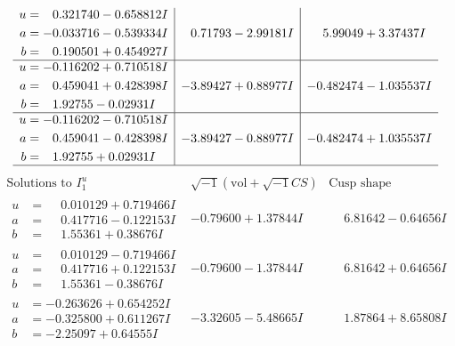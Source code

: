 \documentclass[1p]{elsarticle_modified}
\theoremstyle{definition}
\newcommand{\I}{\sqrt{-1}}
\begin{document}
$$\begin{array}{c|c|c}
\begin{aligned}
u &= \phantom{-}0.321740 - 0.658812 I \\
a &= -0.033716 - 0.539334 I \\
b &= \phantom{-}0.190501 + 0.454927 I\end{aligned}
 & \phantom{-}0.71793 - 2.99181 I & \phantom{-}5.99049 + 3.37437 I \\ \hline\begin{aligned}
u &= -0.116202 + 0.710518 I \\
a &= \phantom{-}0.459041 + 0.428398 I \\
b &= \phantom{-}1.92755 - 0.02931 I\end{aligned}
 & -3.89427 + 0.88977 I & -0.482474 - 1.035537 I \\ \hline\begin{aligned}
u &= -0.116202 - 0.710518 I \\
a &= \phantom{-}0.459041 - 0.428398 I \\
b &= \phantom{-}1.92755 + 0.02931 I\end{aligned}
 & -3.89427 - 0.88977 I & -0.482474 + 1.035537 I\\
 \hline 
 \end{array}$$\newpage$$\begin{array}{c|c|c}  
\text{Solutions to }I^u_{1}& \I (\text{vol} + \sqrt{-1}CS) & \text{Cusp shape}\\
 \hline 
\begin{aligned}
u &= \phantom{-}0.010129 + 0.719466 I \\
a &= \phantom{-}0.417716 - 0.122153 I \\
b &= \phantom{-}1.55361 + 0.38676 I\end{aligned}
 & -0.79600 + 1.37844 I & \phantom{-}6.81642 - 0.64656 I \\ \hline\begin{aligned}
u &= \phantom{-}0.010129 - 0.719466 I \\
a &= \phantom{-}0.417716 + 0.122153 I \\
b &= \phantom{-}1.55361 - 0.38676 I\end{aligned}
 & -0.79600 - 1.37844 I & \phantom{-}6.81642 + 0.64656 I \\ \hline\begin{aligned}
u &= -0.263626 + 0.654252 I \\
a &= -0.325800 + 0.611267 I \\
b &= -2.25097 + 0.64555 I\end{aligned}
 & -3.32605 - 5.48665 I & \phantom{-}1.87864 + 8.65808 I \\ \hline\begin{aligned}

\end{aligned}
\end{array}$$
\end{document}
